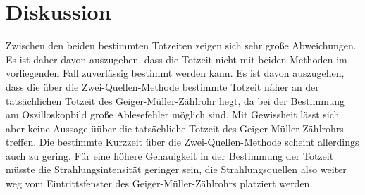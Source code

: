 \section{Diskussion}
\label{sec:Diskussion}
Zwischen den beiden bestimmten Totzeiten zeigen sich sehr große Abweichungen.
Es ist daher davon auszugehen, dass die Totzeit nicht mit beiden Methoden im vorliegenden Fall zuverlässig bestimmt werden kann. Es ist davon auszugehen, dass die über die Zwei-Quellen-Methode bestimmte Totzeit näher an der tatsächlichen Totzeit des Geiger-Müller-Zählrohr liegt, da bei der Bestimmung am Oszilloskopbild große Ablesefehler möglich sind.
Mit Gewissheit lässt sich aber keine Aussage üüber die tatsächliche Totzeit des Geiger-Müller-Zählrohrs treffen.
Die bestimmte Kurzzeit über die Zwei-Quellen-Methode scheint allerdings auch zu gering.
Für eine höhere Genauigkeit in der Bestimmung der Totzeit müsste die Strahlungsintensität geringer sein, die Strahlungsquellen also weiter weg vom Eintrittsfenster des Geiger-Müller-Zählrohrs platziert werden. 
